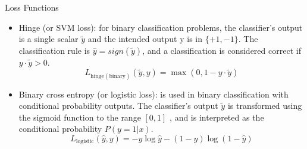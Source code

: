 \documentclass[handout]{beamer}
\begin{document}
\begin{frame}{Loss Functions}
\begin{scriptsize}
\begin{itemize}
 \item Hinge (or SVM loss):  for binary classification problems, the classifier's output is a single scalar $\tilde{y}$ and the intended output y is in $\{+1,-1\}$.  The classification rule is $\hat{y} = sign(\tilde{y})$, and a classification is considered correct if $y \cdot \tilde{y} > 0$.  
 \begin{displaymath}
  L_{\text{hinge}(\text{binary})}(\tilde{y},y) = \max(0,1-y \cdot \tilde{y})  
 \end{displaymath}

 \item Binary cross entropy (or logistic loss): is used in binary classification with conditional probability outputs. The classifier's output $\tilde{y}$ is transformed using the sigmoid function to the range $[0,1]$ , and is interpreted as the conditional probability $P(y=1|x)$.
  \begin{displaymath}
  L_{\text{logistic}}(\hat{y},y) = -y \log \hat{y} - (1-y) \log(1-\hat{y})  
 \end{displaymath}
 
\end{itemize}
\end{scriptsize}

\end{frame}
\end{document}
